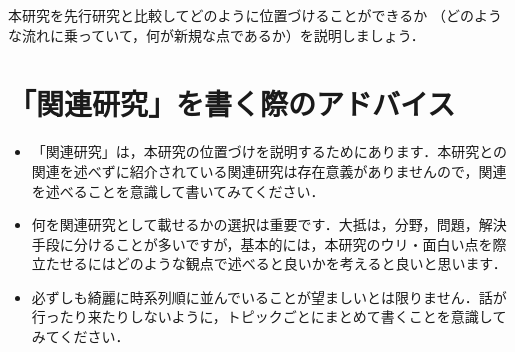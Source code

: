 本研究を先行研究と比較してどのように位置づけることができるか
（どのような流れに乗っていて，何が新規な点であるか）を説明しましょう．

\section{「関連研究」を書く際のアドバイス}
\begin{itemize}
    \item 「関連研究」は，本研究の位置づけを説明するためにあります．本研究との関連を述べずに紹介されている関連研究は存在意義がありませんので，関連を述べることを意識して書いてみてください．
    \item 何を関連研究として載せるかの選択は重要です．大抵は，分野，問題，解決手段に分けることが多いですが，基本的には，本研究のウリ・面白い点を際立たせるにはどのような観点で述べると良いかを考えると良いと思います．
    \item 必ずしも綺麗に時系列順に並んでいることが望ましいとは限りません．話が行ったり来たりしないように，トピックごとにまとめて書くことを意識してみてください．
\end{itemize}
